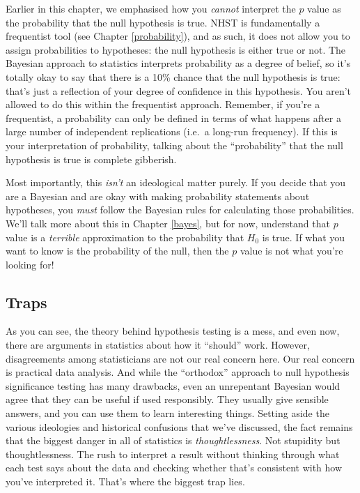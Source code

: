 \documentclass[
]{book}
\theoremstyle{definition}
\theoremstyle{definition}
\theoremstyle{definition}
\theoremstyle{definition}
\theoremstyle{remark}
\begin{document}
Earlier in this chapter, we emphasised how you \emph{cannot} interpret the \(p\) value as the probability that the null hypothesis is true. NHST is fundamentally a frequentist tool (see Chapter \ref{probability}), and as such, it does not allow you to assign probabilities to hypotheses: the null hypothesis is either true or not. The Bayesian approach to statistics interprets probability as a degree of belief, so it's totally okay to say that there is a 10\% chance that the null hypothesis is true: that's just a reflection of your degree of confidence in this hypothesis. You aren't allowed to do this within the frequentist approach. Remember, if you're a frequentist, a probability can only be defined in terms of what happens after a large number of independent replications (i.e.~a long-run frequency). If this is your interpretation of probability, talking about the ``probability'' that the null hypothesis is true is complete gibberish.

Most importantly, this \emph{isn't} an ideological matter purely. If you decide that you are a Bayesian and are okay with making probability statements about hypotheses, you \emph{must} follow the Bayesian rules for calculating those probabilities. We'll talk more about this in Chapter \ref{bayes}, but for now, understand that \(p\) value is a \emph{terrible} approximation to the probability that \(H_0\) is true. If what you want to know is the probability of the null, then the \(p\) value is not what you're looking for!

\hypertarget{traps}{%
\subsection{Traps}\label{traps}}

As you can see, the theory behind hypothesis testing is a mess, and even now, there are arguments in statistics about how it ``should'' work. However, disagreements among statisticians are not our real concern here. Our real concern is practical data analysis. And while the ``orthodox'' approach to null hypothesis significance testing has many drawbacks, even an unrepentant Bayesian would agree that they can be useful if used responsibly. They usually give sensible answers, and you can use them to learn interesting things. Setting aside the various ideologies and historical confusions that we've discussed, the fact remains that the biggest danger in all of statistics is \emph{thoughtlessness}. Not stupidity but thoughtlessness. The rush to interpret a result without thinking through what each test says about the data and checking whether that's consistent with how you've interpreted it. That's where the biggest trap lies.
\end{document}
